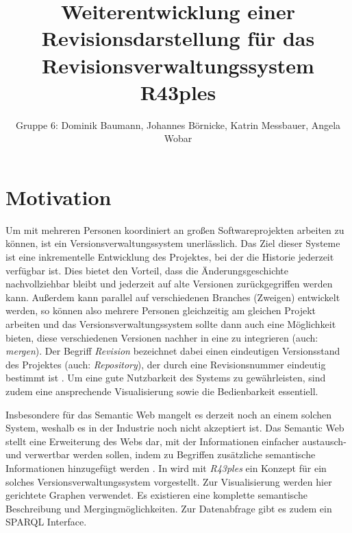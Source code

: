 \documentclass[nocolor]{tudbook}
\begin{document}
\author{Gruppe 6: Dominik Baumann, Johannes Börnicke, Katrin Messbauer, Angela Wobar}
\title{Weiterentwicklung einer Revisionsdarstellung für das Revisionsverwaltungssystem R43ples}
\maketitle

\tableofcontents

\chapter{Motivation}
Um mit mehreren Personen koordiniert an großen Softwareprojekten arbeiten zu können, ist ein Versionsverwaltungssystem unerlässlich. Das Ziel dieser Systeme ist eine inkrementelle Entwicklung des Projektes, bei der die Historie jederzeit verfügbar ist. Dies bietet den Vorteil, dass die Änderungsgeschichte nachvollziehbar bleibt und jederzeit auf alte Versionen zurückgegriffen werden kann. Außerdem kann parallel auf verschiedenen Branches (Zweigen) entwickelt werden, so können also mehrere Personen gleichzeitig am gleichen Projekt arbeiten und das Versionsverwaltungssystem sollte dann auch eine Möglichkeit bieten, diese verschiedenen Versionen nachher in eine zu integrieren (auch: \textit{mergen}). Der Begriff \textit{Revision} bezeichnet dabei einen eindeutigen Versionsstand des Projektes (auch: \textit{Repository}), der durch eine Revisionsnummer eindeutig bestimmt ist \cite{CAE}. Um eine gute Nutzbarkeit des Systems zu gewährleisten, sind zudem eine ansprechende Visualisierung sowie die Bedienbarkeit essentiell.

Insbesondere für das Semantic Web mangelt es derzeit noch an einem solchen System, weshalb es in der Industrie noch nicht akzeptiert ist. Das Semantic Web stellt eine Erweiterung des Webs dar, mit der Informationen einfacher austausch- und verwertbar werden sollen, indem zu Begriffen zusätzliche semantische Informationen hinzugefügt werden \cite{SemanticWeb}. In \cite{Graube} wird mit \textit{R43ples} ein Konzept für ein solches Versionsverwaltungssystem vorgestellt. Zur Visualisierung werden hier gerichtete Graphen verwendet. Es existieren eine komplette semantische Beschreibung und Mergingmöglichkeiten. Zur Datenabfrage gibt es zudem ein SPARQL Interface. 
\end{document}
